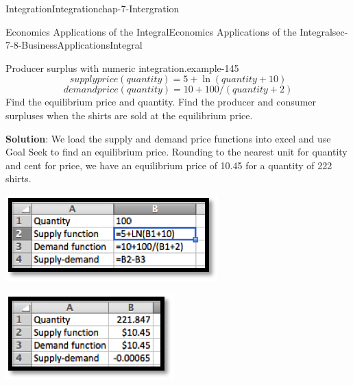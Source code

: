 \documentclass[oneside,10pt,]{book}
\newcommand{\terminology}[1]{\textbf{#1}}
\numberwithin{equation}{section}
\begin{document}
\begin{chapterptx}{Integration}{}{Integration}{}{}{chap-7-Intergration}
\begin{sectionptx}{Economics Applications of the Integral}{}{Economics Applications of the Integral}{}{}{sec-7-8-BusinessApplicationsIntegral}
\begin{example}{Producer surplus with numeric integration.}{example-145}
%
\begin{equation*}
supply price(quantity)=5+\ln (quantity+10)
\end{equation*}
%
\begin{equation*}
demand price(quantity)=10+100/(quantity+2)
\end{equation*}
\hypertarget{p-3094}{}%
Find the equilibrium price and quantity.  Find the producer and consumer surpluses when the shirts are sold at the equilibrium price.%
\par
\hypertarget{p-3095}{}%
\terminology{Solution}: We load the supply and demand price functions into excel and use Goal Seek to find an equilibrium price.  Rounding to the nearest unit for quantity and cent for price, we have an equilibrium price of \textdollar{}10.45 for a quantity of 222 shirts.%
\begin{sidebyside}{1}{0.3}{0.3}{0}%
\begin{sbspanel}{0.4}%
\includegraphics[width=1\linewidth]{images/sec7-8-4.png}
\end{sbspanel}%
\end{sidebyside}%
\begin{sidebyside}{1}{0.3}{0.3}{0}%
\begin{sbspanel}{0.4}%
\includegraphics[width=1\linewidth]{images/sec7-8-5.png}
\end{sbspanel}%
\end{sidebyside}%

\end{example}
\end{sectionptx}
\end{chapterptx}
\end{document}
